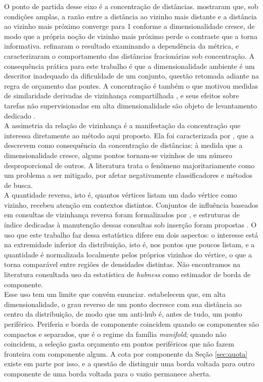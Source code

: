 O ponto de partida desse eixo é a concentração de distâncias.  mostraram que, sob condições amplas, a razão entre a distância ao vizinho mais distante e a distância ao vizinho mais próximo converge para 1 conforme a dimensionalidade cresce, de modo que a própria noção de vizinho mais próximo perde o contraste que a torna informativa.  refinaram o resultado examinando a dependência da métrica, e  caracterizaram o comportamento das distâncias fracionárias sob concentração. A consequência prática para este trabalho é que a dimensionalidade ambiente é um descritor inadequado da dificuldade de um conjunto, questão retomada adiante na regra de orçamento das pontes. A concentração é também o que motivou medidas de similaridade derivadas de vizinhança compartilhada \cite{shared-neighbor}, e seus efeitos sobre tarefas não supervisionadas em alta dimensionalidade são objeto de levantamento dedicado \cite{zimek-survey}.\\

A assimetria da relação de vizinhança é a manifestação da concentração que interessa diretamente ao método aqui proposto. Ela foi caracterizada por , que a descrevem como consequência da concentração de distâncias: à medida que a dimensionalidade cresce, alguns pontos tornam-se vizinhos de um número desproporcional de outros. A literatura trata o fenômeno majoritariamente como um problema a ser mitigado, por afetar negativamente classificadores e métodos de busca.\\

A quantidade reversa, isto é, quantos vértices listam um dado vértice como vizinho, recebeu atenção em contextos distintos. Conjuntos de influência baseados em consultas de vizinhança reversa foram formalizados por , e estruturas de índice dedicadas à manutenção dessas consultas sob inserção foram propostas \cite{rdnntree}. O uso que este trabalho faz dessa estatística difere em dois aspectos: o interesse está na extremidade inferior da distribuição, isto é, nos pontos que poucos listam, e a quantidade é normalizada localmente pelos próprios vizinhos do vértice, o que a torna comparável entre regiões de densidades distintas. Não encontramos na literatura consultada uso da estatística de \textit{hubness} como estimador de borda de componente.\\

Esse uso tem um limite que convém enunciar.  estabelecem que, em alta dimensionalidade, o grau reverso de um ponto decresce com sua distância ao centro da distribuição, de modo que um anti-hub é, antes de tudo, um ponto periférico. Periferia e borda de componente coincidem quando os componentes são compactos e separados, que é o regime da família \textit{manifold}; quando não coincidem, a seleção gasta orçamento em pontos periféricos que não fazem fronteira com componente algum. A cota por componente da Seção \ref{sec:quota} existe em parte por isso, e a questão de distinguir uma borda voltada para outro componente de uma borda voltada para o vazio permanece aberta.\\

